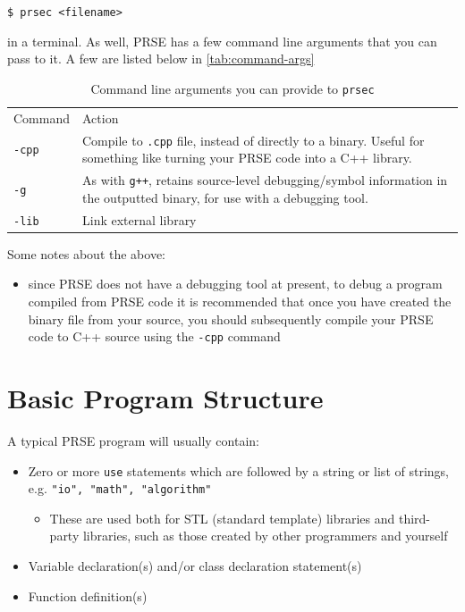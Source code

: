 \documentclass[letterpaper, 12pt]{article}
\begin{document}
\texttt{\$ prsec <filename>}\linebreak

in a terminal. As well, PRSE has a few command line arguments that you can pass to it. A few are
listed below in \autoref{tab:command-args}

\begin{table}[h]
   \centering
   \captionsetup{justification=centering}
   \caption{Command line arguments you can provide to \texttt{prsec}}
   \rule{0pt}{0.5cm} 
   \begin{tabularx}{400pt}{|X|X|}
      \hline
      Command            & Action           \\
      \texttt{-cpp}      & Compile to \texttt{.cpp} file, instead of directly to a binary. Useful for
                           something like turning your PRSE code into a C++ library. \\
      \texttt{-g}        & As with \texttt{g++}, retains source-level debugging/symbol information in the
                           outputted binary, for use with a debugging tool.\\
      \texttt{-lib}      & Link external library \\
      \hline
   \end{tabularx}
   \label{tab:command-args}
\end{table}

Some notes about the above:
\begin{itemize}
   \item since PRSE does not have a debugging tool at present, to debug a program compiled from PRSE
      code it is recommended that once you have created the binary file from your source, you should
      subsequently compile your PRSE code to C++ source using the \texttt{-cpp} command
\end{itemize}

\newpage

\section{Basic Program Structure}

A typical PRSE program will usually contain:

\begin{itemize}
\item Zero or more \texttt{use} statements which are followed by a string or list of strings, e.g. \texttt{"io", "math", "algorithm"}
\begin{itemize}
   \item These are used both for STL (standard template) libraries and third-party libraries, such as those created by other programmers and yourself
\end{itemize}
\item Variable declaration(s) and/or class declaration statement(s)
\item Function definition(s)
\end{itemize}
\end{document}
